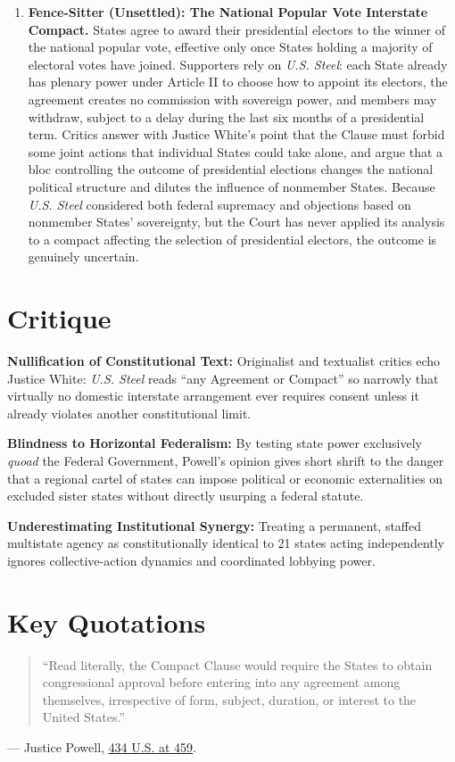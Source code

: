 \documentclass[12pt]{article}
\begin{document}
\begin{enumerate}
\item \textbf{Fence-Sitter (Unsettled): The National Popular Vote Interstate Compact.} States agree to award their presidential electors to the winner of the national popular vote, effective only once States holding a majority of electoral votes have joined. Supporters rely on \textit{U.S. Steel}: each State already has plenary power under Article II to choose how to appoint its electors, the agreement creates no commission with sovereign power, and members may withdraw, subject to a delay during the last six months of a presidential term. Critics answer with Justice White's point that the Clause must forbid some joint actions that individual States could take alone, and argue that a bloc controlling the outcome of presidential elections changes the national political structure and dilutes the influence of nonmember States. Because \textit{U.S. Steel} considered both federal supremacy and objections based on nonmember States' sovereignty, but the Court has never applied its analysis to a compact affecting the selection of presidential electors, the outcome is genuinely uncertain.

\end{enumerate}

\section{Critique}
\textbf{Nullification of Constitutional Text:} Originalist and textualist critics echo Justice White: \textit{U.S. Steel} reads ``any Agreement or Compact'' so narrowly that virtually no domestic interstate arrangement ever requires consent unless it already violates another constitutional limit.

\textbf{Blindness to Horizontal Federalism:} By testing state power exclusively \textit{quoad} the Federal Government, Powell's opinion gives short shrift to the danger that a regional cartel of states can impose political or economic externalities on excluded sister states without directly usurping a federal statute.

\textbf{Underestimating Institutional Synergy:} Treating a permanent, staffed multistate agency as constitutionally identical to 21 states acting independently ignores collective-action dynamics and coordinated lobbying power.

\section{Key Quotations}
\begin{quote}
``Read literally, the Compact Clause would require the States to obtain congressional approval before entering into any agreement among themselves, irrespective of form, subject, duration, or interest to the United States.''
\end{quote}
\noindent --- Justice Powell, \href{https://supreme.justia.com/cases/federal/us/434/452/}{434 U.S. at 459}.
\end{document}
